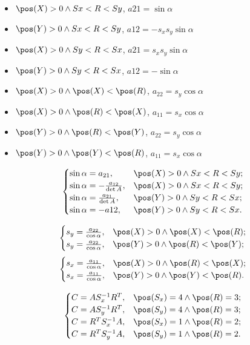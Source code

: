 \begin{itemize}
	\item $\pos(X)>0 \wedge Sx < R < Sy$, $a21 = \sin\alpha$
	\item $\pos(Y)>0 \wedge Sx < R < Sy$, $a12 = - s_x s_y \sin\alpha$
	\item $\pos(X)>0 \wedge Sy < R < Sx$, $a21 = s_x s_y \sin\alpha$
	\item $\pos(Y)>0 \wedge Sy < R < Sx$, $a12 = - \sin\alpha$
	\item $\pos(X) >0 \wedge \pos(X) < \pos(R)$, $a_{22} = s_y \cos\alpha$
	\item $\pos(X) >0 \wedge \pos(R) < \pos(X)$, $a_{11} = s_x \cos\alpha$
	\item $\pos(Y) >0 \wedge \pos(R) < \pos(Y)$, $a_{22} = s_y \cos\alpha$
	\item $\pos(Y) >0 \wedge \pos(Y) < \pos(R)$, $a_{11} = s_x \cos\alpha$
\end{itemize}

$$\begin{cases}
	\sin\alpha = a_{21},                & \pos(X)>0 \wedge Sx < R < Sy;\\
	\sin\alpha = -\frac{a_{12}}{\det A},& \pos(X)>0 \wedge Sx < R < Sy;\\
	\sin\alpha = \frac{a_{21}}{\det A}, & \pos(Y)>0 \wedge Sy < R < Sx;\\
	\sin\alpha = -a12,                  & \pos(Y)>0 \wedge Sy < R < Sx.
\end{cases}$$

$$\begin{cases}
	s_y = \frac{a_{22}}{\cos\alpha}, & \pos(X) >0 \wedge \pos(X) < \pos(R);\\
	s_y = \frac{a_{22}}{\cos\alpha}, & \pos(Y) >0 \wedge \pos(R) < \pos(Y);
\end{cases}$$
$$\begin{cases}
	s_x = \frac{a_{11}}{\cos\alpha}, & \pos(X) >0 \wedge \pos(R) < \pos(X);\\
	s_x = \frac{a_{11}}{\cos\alpha}, & \pos(Y) >0 \wedge \pos(Y) < \pos(R).
\end{cases}$$

$$\begin{cases}
	C = A S_x^{-1} R^T, & \pos(S_x)=4 \wedge \pos(R)=3;\\
	C = A S_y^{-1} R^T, & \pos(S_y)=4 \wedge \pos(R)=3;\\
	C = R^T S_x^{-1} A, & \pos(S_x)=1 \wedge \pos(R)=2;\\
	C = R^T S_y^{-1} A, & \pos(S_y)=1 \wedge \pos(R)=2.
\end{cases}$$

